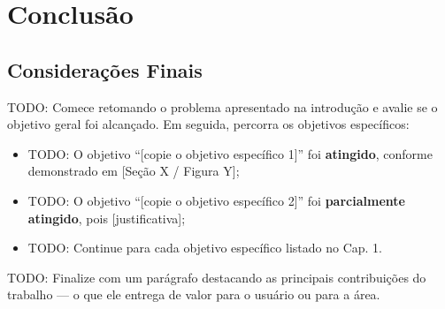 %
%

\chapter{Conclusão}
\label{cap:conclusao}


\section{Considerações Finais}
\label{sec:consideracoes-finais}

TODO: Comece retomando o problema apresentado na introdução e avalie
se o objetivo geral foi alcançado. Em seguida, percorra os objetivos
específicos:

\begin{itemize}
  \item TODO: O objetivo ``[copie o objetivo específico 1]'' foi
        \textbf{atingido}, conforme demonstrado em [Seção X / Figura Y];
  \item TODO: O objetivo ``[copie o objetivo específico 2]'' foi
        \textbf{parcialmente atingido}, pois [justificativa];
  \item TODO: Continue para cada objetivo específico listado no Cap. 1.
\end{itemize}

TODO: Finalize com um parágrafo destacando as principais contribuições
do trabalho — o que ele entrega de valor para o usuário ou para a área.


